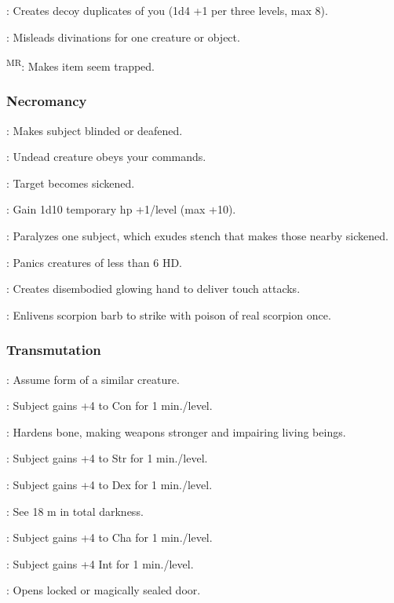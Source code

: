 	: Creates decoy duplicates of you (1d4 +1 per three levels, max 8).

	: Misleads divinations for one creature or object.

	\textsuperscript{MR}: Makes item seem trapped.

\subsubsection{Necromancy}
	: Makes subject blinded or deafened.

	: Undead creature obeys your commands.

	: Target becomes sickened. %

	: Gain 1d10 temporary hp +1/level (max +10).

	: Paralyzes one subject, which exudes stench that makes those nearby sickened.

	: Panics creatures of less than 6 HD.

	: Creates disembodied glowing hand to deliver touch attacks.

	: Enlivens scorpion barb to strike with poison of real scorpion once. %

\subsubsection{Transmutation}
	: Assume form of a similar creature.

	: Subject gains +4 to Con for 1 min./level.

	: Hardens bone, making weapons stronger and impairing living beings. %

	: Subject gains +4 to Str for 1 min./level.

	: Subject gains +4 to Dex for 1 min./level.

	: See 18 m in total darkness.

	: Subject gains +4 to Cha for 1 min./level.

	: Subject gains +4 Int for 1 min./level.

	: Opens locked or magically sealed door.

